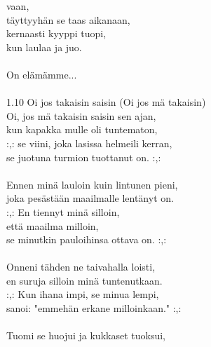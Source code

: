  vaan, \\ täyttyyhän se taas aikanaan, \\ kernaasti kyyppi tuopi, \\ kun laulaa ja juo. \\ \hspace{10mm} \\ On elämämme... \\ \hspace{10mm} \\ 1.10 Oi jos takaisin saisin (Oi jos mä takaisin) \\ Oi, jos mä takaisin saisin sen ajan, \\ kun kapakka mulle oli tuntematon, \\ :,: se viini, joka lasissa helmeili kerran, \\ se juotuna turmion tuottanut on. :,: \\ \hspace{10mm} \\ Ennen minä lauloin kuin lintunen pieni, \\ joka pesästään maailmalle lentänyt on. \\ :,: En tiennyt minä silloin,  \\ että maailma milloin,  \\ se minutkin pauloihinsa ottava on. :,: \\ \hspace{10mm} \\ Onneni tähden ne taivahalla loisti, \\ en suruja silloin minä tuntenutkaan. \\ :,: Kun ihana impi, se minua lempi, \\ sanoi: "emmehän erkane milloinkaan." :,: \\ \hspace{10mm} \\ Tuomi se huojui ja kukkaset tuoksui, \